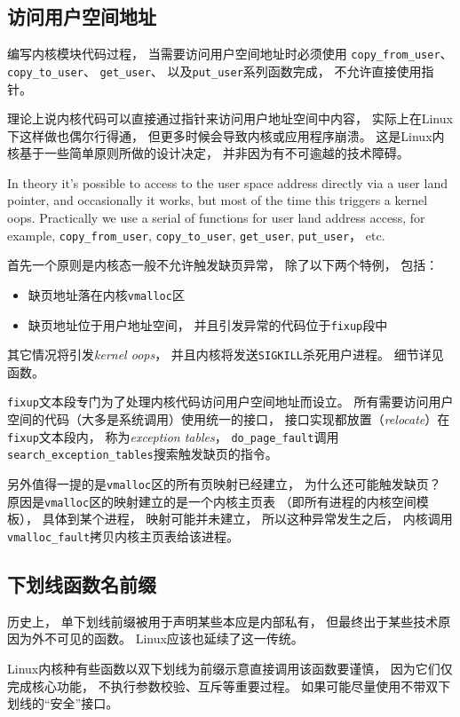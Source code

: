 \subsection{访问用户空间地址}
编写内核模块代码过程，
当需要访问用户空间地址时必须使用%
\verb|copy_from_user|、
\verb|copy_to_user|、
\verb|get_user|、
以及\verb|put_user|系列函数完成，
不允许直接使用指针。

理论上说内核代码可以直接通过指针来访问用户地址空间中内容，
实际上在Linux下这样做也偶尔行得通，
但更多时候会导致内核或应用程序崩溃。
这是Linux内核基于一些简单原则所做的设计决定，
并非因为有不可逾越的技术障碍。

{\color{red}
In theory it's possible to access to the user space address
directly via a user land pointer,
and occasionally it works,
but most of the time this triggers a kernel oops.
Practically we use a serial of functions for user land address access,
for example,
\verb|copy_from_user|,
\verb|copy_to_user|,
\verb|get_user|,
\verb|put_user|，
etc.}

首先一个原则是内核态一般不允许触发缺页异常，
除了以下两个特例，
包括：
\begin{itemize}
  \item 缺页地址落在内核\verb|vmalloc|区
  \item 缺页地址位于用户地址空间，
  并且引发异常的代码位于\verb|fixup|段中
\end{itemize}
其它情况将引发{\em kernel oops}，
并且内核将发送\verb|SIGKILL|杀死用户进程。
细节详见函数。

\verb|fixup|文本段专门为了处理内核代码访问用户空间地址而设立。
所有需要访问用户空间的代码（大多是系统调用）使用统一的接口，
接口实现都放置（{\em relocate}）在\verb|fixup|文本段内，
称为{\em exception tables}，
\verb|do_page_fault|调用\verb|search_exception_tables|搜索触发缺页的指令。

另外值得一提的是\verb|vmalloc|区的所有页映射已经建立，
为什么还可能触发缺页？
原因是\verb|vmalloc|区的映射建立的是一个内核主页表
（即所有进程的内核空间模板），
具体到某个进程，
映射可能并未建立，
所以这种异常发生之后，
内核调用\verb|vmalloc_fault|拷贝内核主页表给该进程。

\subsection{下划线函数名前缀}
历史上，
单下划线前缀被用于声明某些本应是内部私有，
但最终出于某些技术原因为外不可见的函数。
Linux应该也延续了这一传统。

Linux内核种有些函数以双下划线为前缀示意直接调用该函数要谨慎，
因为它们仅完成核心功能，
不执行参数校验、互斥等重要过程。
如果可能尽量使用不带双下划线的``安全''接口。


